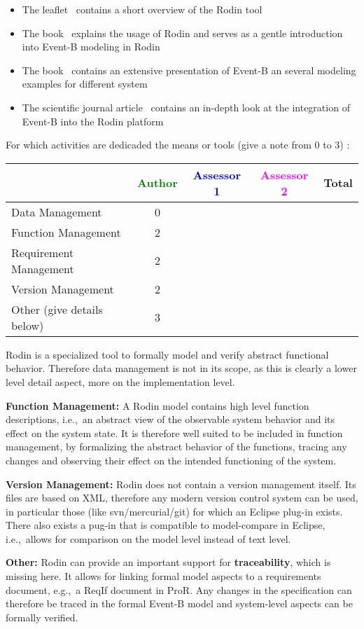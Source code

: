 \begin{itemize}
\item The leaflet~\cite{RodinLeaflet} contains a short overview of the Rodin
  tool
\item The book~\cite{RodinHandbook} explains the usage of Rodin and serves as a
  gentle introduction into Event-B modeling in Rodin
\item The book~\cite{Abrial:2010:MES:1855020} contains an extensive presentation
  of Event-B an several modeling examples for different system
\item The scientific journal article~\cite{AbrialBHHMV10} contains an in-depth
  look at the integration of Event-B into the Rodin platform
\end{itemize}

For which activities are dedicaded the means or tools (give a note from 0 to  3) :

\begin{tabular}{|l | c | c | c | c|}
\hline
& \textcolor{green}{Author} & \textcolor{blue}{Assessor 1} & \textcolor{magenta}{Assessor 2} & Total \\
\hline
Data Management & 0  & & &  \\
\hline
Function Management & 2 & & & \\
\hline
Requirement Management & 2 & & & \\
\hline
Version Management & 2 & & & \\
\hline
Other (give details below) & 3 & & & \\
\hline
\end{tabular}

\begin{author_comment}
  Rodin is a specialized tool to formally model and verify abstract functional
  behavior. Therefore data management is not in its scope, as this is clearly a
  lower level detail aspect, more on the implementation level.

  \textbf{Function Management:} A Rodin model contains high level function
  descriptions, i.e.,\ an abstract view of the observable system behavior and
  its effect on the system state. It is therefore well suited to be included in
  function management, by formalizing the abstract behavior of the functions,
  tracing any changes and observing their effect on the intended functioning of
  the system.

  \textbf{Version Management:} Rodin does not contain a version management
  itself. Its files are based on XML, therefore any modern version control
  system can be used, in particular those (like svn/mercurial/git) for which an
  Eclipse plug-in exists. There also exists a pug-in that is compatible to
  model-compare in Eclipse, i.e.,\ allows for comparison on the model level
  instead of text level.

  \textbf{Other:} Rodin can provide an important support for
  \textbf{traceability}, which is missing here. It allows for linking formal
  model aspects to a requirements document, e.g.,\ a ReqIf document in ProR. Any
  changes in the specification can therefore be traced in the formal Event-B
  model and system-level aspects can be formally verified.
\end{author_comment}

